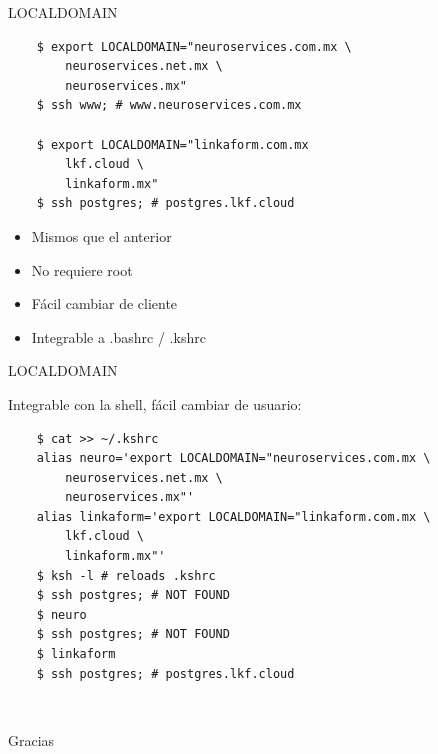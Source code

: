 \documentclass[11pt,spanish]{article}
\newcommand{\rowsp}[1][1em]{\vspace{#1}}
\newcommand{\hone}[1]{{\rowsp[0.3em]\noindent\Large #1 \rowsp[0.3em]}}
\newcommand{\myitm}[1]{\begin{itemize}#1\end{itemize}}
\newcommand{\pros}{\item[pros:]}
\begin{document}
\newpage %

\hone{LOCALDOMAIN}

\begin{lstlisting}
	$ export LOCALDOMAIN="neuroservices.com.mx \
		neuroservices.net.mx \
		neuroservices.mx"
	$ ssh www; # www.neuroservices.com.mx

	$ export LOCALDOMAIN="linkaform.com.mx
		lkf.cloud \
		linkaform.mx"
	$ ssh postgres; # postgres.lkf.cloud
\end{lstlisting}

\myitm{
	\pros Mismos que el anterior
	\pros No requiere root
	\pros Fácil cambiar de cliente
	\pros Integrable a .bashrc / .kshrc
}

\newpage %

\hone{LOCALDOMAIN}

Integrable con la shell, fácil cambiar de usuario:

\begin{lstlisting}
	$ cat >> ~/.kshrc
	alias neuro='export LOCALDOMAIN="neuroservices.com.mx \
		neuroservices.net.mx \
		neuroservices.mx"'
	alias linkaform='export LOCALDOMAIN="linkaform.com.mx \
		lkf.cloud \
		linkaform.mx"'
	$ ksh -l # reloads .kshrc
	$ ssh postgres; # NOT FOUND
	$ neuro
	$ ssh postgres; # NOT FOUND
	$ linkaform
	$ ssh postgres; # postgres.lkf.cloud
\end{lstlisting}

\newpage %
\ 
\begin{center}
\hone{Gracias}
\end{center}

\label{lastpage}
\end{document}
